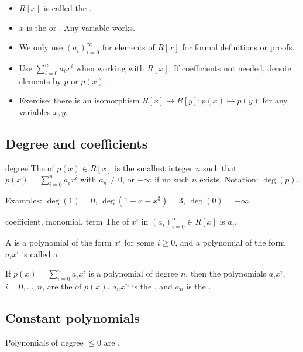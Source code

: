 \documentclass[12pt,letterpaper]{report}
\begin{document}
\begin{itemize}
  \item $R[x]$ is called the .
  \item $x$ is the  or .
    Any variable works.
  \item We only use $(a_i)_{i = 0}^\infty$ for elements of $R[x]$ for formal definitions or proofs.
  \item Use $\sum_{i = 0}^n a_i x^i$ when working with $R[x]$.
    If coefficients not needed, denote elements by $p$ or $p(x)$.
  \item Exercise: there is an isomorphism $R[x] \to R[y] : p(x) \mapsto p(y)$ for any variables
    $x, y$.
\end{itemize}

\pagebreak
\subsection{Degree and coefficients}

\begin{defn}{degree}{}
  The  of $p(x) \in R[x]$ is the smallest integer $n$ such that
  $p(x) = \sum_{i = 0}^n a_i x^i$ with $a_n \neq 0$, or $-\infty$ if no such $n$ exists.
  Notation: $\deg(p)$.
\end{defn}

Examples: $\deg(1) = 0$, $\deg(1 + x - x^3) = 3$, $\deg(0) = -\infty$.

\begin{defn}{coefficient, monomial, term}{}
  The  of $x^i$ in $(a_i)_{i = 0}^\infty \in R[x]$ is $a_i$.

  A  is a polynomial of the form $x^i$ for some $i \geq 0$, and a polynomial of the
  form $a_i x^i$ is called a .

  If $p(x) = \sum_{i = 0}^n a_i x^i$ is a polynomial of degree $n$, then the polynomials $a_i x^i$,
  $i = 0, \ldots, n$, are the  of $p(x)$.
  $a_n x^n$ is the , and $a_n$ is the .
\end{defn}

\pagebreak
\subsection{Constant polynomials}

Polynomials of degree $\leq 0$ are .
\end{document}

